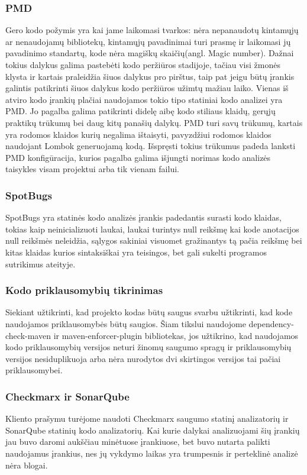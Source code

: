 \documentclass{VUMIFPSkursinis}
\begin{document}
		\subsubsection{PMD}
			Gero kodo požymis yra kai jame laikomasi tvarkos: nėra nepanaudotų kintamųjų ar nenaudojamų bibliotekų, kintamųjų pavadinimai turi prasmę ir laikomasi jų pavadinimo standartų, kode nėra magiškų skaičių(angl. Magic number). Dažnai tokius dalykus galima pastebėti kodo peržiūros stadijoje, tačiau visi žmonės klysta ir kartais praleidžia šiuos dalykus pro pirštus, taip pat jeigu būtų įrankis galintis patikrinti šiuos dalykus kodo peržiūros užimtų mažiau laiko.
			Vienas iš atviro kodo įrankių plačiai naudojamos tokio tipo statiniai kodo analizei yra PMD. Jo pagalba galima patikrinti didelę aibę kodo stiliaus klaidų, gerųjų praktikų trūkumų bei daug kitų panašių dalykų.
			PMD turi savų trūkumų, kartais yra rodomos klaidos kurių negalima ištaisyti, pavyzdžiui rodomos klaidos naudojant Lombok generuojamą kodą.
			Išspręsti tokius trūkumus padeda lanksti PMD konfigūracija, kurios pagalba galima išjungti norimas kodo analizės taisykles visam projektui arba tik vienam failui.
		\subsubsection{SpotBugs}
			SpotBugs yra statinės kodo analizės įrankis padedantis surasti kodo klaidas, tokias kaip neinicializuoti laukai, laukai turintys null reikšmę kai kode anotacijos null reikšmės neleidžia, sąlygos sakiniai visuomet gražinantys tą pačia reikšmę bei kitas klaidas kurios sintaksiškai yra teisingos, bet gali sukelti programos sutrikimus ateityje.
		\subsubsection{Kodo priklausomybių tikrinimas}
			Siekiant užtikrinti, kad projekto kodas būtų saugus svarbu užtikrinti, kad kode naudojamos priklausomybės būtų saugios.
			Šiam tikslui naudojome dependency-check-maven ir maven-enforcer-plugin bibliotekas, jos užtikrino, kad naudojamos kodo priklausomybių versijos neturi žinomų saugumo spragų ir priklausomybių versijos nesiduplikuoja arba nėra nurodytos dvi skirtingos versijos tai pačiai priklausomybei.
		\subsubsection{Checkmarx ir SonarQube}
			Kliento prašymu turėjome naudoti Checkmarx saugumo statinį analizatorių ir SonarQube statinių kodo analizatorių.
			Kai kurie dalykai analizuojami šių įrankių jau buvo daromi aukščiau minėtuose įrankiuose, bet buvo nutarta palikti naudojamus įrankius, nes jų vykdymo laikas yra trumpesnis ir perteklinė analizė nėra blogai.
\end{document}
